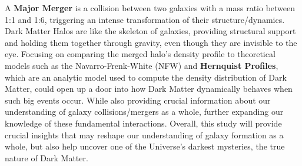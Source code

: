 \documentclass[fleqn,usenatbib]{mnras}
\begin{document}
A \textbf{Major Merger} is a collision between two galaxies with a mass ratio between 1:1 and 1:6, triggering an intense transformation of their structure/dynamics. Dark Matter Halos are like the skeleton of galaxies, providing structural support and holding them together through gravity, even though they are invisible to the eye. Focusing on comparing the merged halo’s density profile to theoretical models such as the Navarro-Frenk-White (NFW) and \textbf{Hernquist Profiles}, which are an analytic model used to compute the density distribution of Dark Matter, could open up a door into how Dark Matter dynamically behaves when such big events occur. While also providing crucial information about our understanding of galaxy collisions/mergers as a whole, further expanding our knowledge of these fundamental interactions. Overall, this study will provide crucial insights that may reshape our understanding of galaxy formation as a whole, but also help uncover one of the Universe's darkest mysteries, the true nature of Dark Matter.
 
\end{document}
